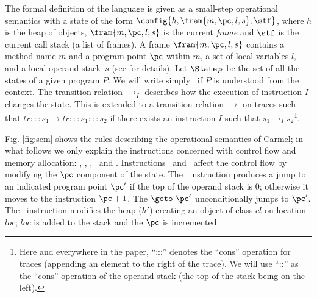 The formal definition of the language is given as a small-step operational semantics with a 
state of the form $\config{h,\fram{m,\pc,l,s},\stf}$, where $h$ is the
heap of objects, $\fram{m,\pc,l,s}$  is the current \emph{frame} and
$\stf$ is the current call stack (a list of frames). A frame
 $\fram{m,\pc,l,s}$ 
contains a method name $m$ and a program point $\pc$ within $m$, a set
of local variables $l$, and a local operand stack~$s$ (see
\cite{Siveroni:03:JavaCardSemantics} for details). Let $\State_P$ be the set of all the states of a given program $P$. We will write simply \State\ if $P$ is understood from the context.
The transition relation $\to_{I}$ describes how the execution of instruction $I$
changes the state.
This is extended to a transition relation $\to$ on traces such that
$\mathit{tr}:::s_1 \to \mathit{tr}:::s_1 :::s_2$ if there exists an
instruction $I$ such that $s_1 \to_I s_2$\footnote{Here and everywhere in the paper, ``:::'' denotes the ``cons'' operation for traces (appending an element to the right of the trace). We will use ``::'' as the ``cons'' operation of the operand stack (the top of the stack being on the left).}.



Fig. \ref{fig:sem} shows the rules describing the operational semantics of Carmel; in what follows we only explain the instructions concerned with control flow and memory allocation: \If, \goto, \invvir, \return\ and \new.
Instructions \If\ and
\goto\ affect the control flow by modifying the $\pc$
component of the state. The \If\ instruction produces a jump to an indicated program
point $\pc'$ if the top of the operand stack is $0$;  otherwise it 
moves to the instruction $\pc+1$. The $\goto\ \pc'$ unconditionally
jumps to $\pc'$. The \new\ instruction modifies the heap ($h'$) creating an object of class $cl$ on location $loc$; $loc$ is added to the stack and the $\pc$ is incremented.

